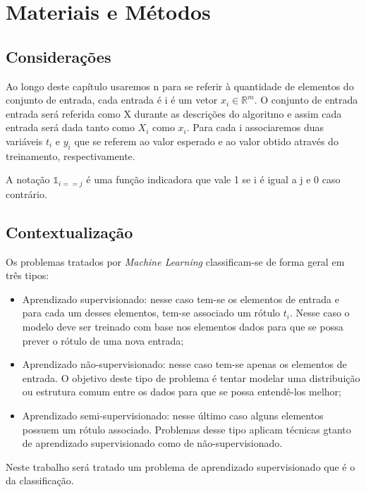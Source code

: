 \chapter{Materiais e Métodos}

\section{Considerações}
\label{sec:considerations}

Ao longo deste capítulo usaremos n para se referir à quantidade de elementos
do conjunto de entrada, cada entrada é i é um vetor $x_i \in \mathbb{R}^m$.
O conjunto de entrada entrada será referida como X
 durante as descrições do algoritmo e assim cada entrada será 
dada tanto como $X_i$ como $x_i$.
Para cada i associaremos duas variáveis $t_i$ e $y_i$ que se referem ao valor
esperado e ao valor obtido através do treinamento, respectivamente.

A notação $\mathds{1}_{i == j}$ é uma função indicadora que vale 1 se i é
igual a j e 0 caso contrário.

\section{Contextualização}
\label{sec:methods}

Os problemas tratados por \textit{Machine Learning} classificam-se de forma
geral em três tipos:

\begin{itemize}
	\item Aprendizado supervisionado: nesse caso tem-se os elementos de entrada e
	para cada um desses elementos, tem-se associado um rótulo $t_i$. Nesse caso o modelo
	deve ser treinado com base nos elementos dados para que se possa prever o rótulo %
	de uma nova entrada;
	\item Aprendizado não-supervisionado: nesse caso tem-se apenas os elementos de entrada. 
	O objetivo deste tipo de problema é tentar modelar uma distribuição ou estrutura comum
	entre os dados para que se possa entendê-los melhor;
	\item Aprendizado semi-supervisionado: nesse último caso alguns elementos possuem um rótulo
	associado. Problemas desse tipo aplicam técnicas gtanto de aprendizado supervisionado como
	de não-supervisionado.
\end{itemize}

Neste trabalho será tratado um problema de aprendizado supervisionado que é o da classificação.

